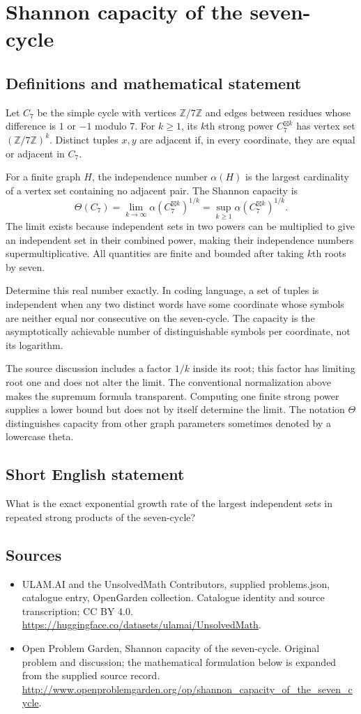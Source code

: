 \documentclass[11pt,a4paper]{article}
\begin{document}
\section*{Shannon capacity of the seven-cycle}\label{statement}

\subsection{Definitions and mathematical statement}
Let $C_7$ be the simple cycle with vertices $\mathbb Z/7\mathbb Z$ and
edges between residues whose difference is $1$ or $-1$ modulo $7$.
For $k\ge1$, its $k$th strong power $C_7^{\boxtimes k}$ has vertex set
$(\mathbb Z/7\mathbb Z)^k$. Distinct tuples $x,y$ are adjacent if,
in every coordinate, they are equal or adjacent in $C_7$.

For a finite graph $H$, the independence number $\alpha(H)$ is the
largest cardinality of a vertex set containing no adjacent pair.
The Shannon capacity is
\[
 \Theta(C_7)=\lim_{k\to\infty}
       \alpha(C_7^{\boxtimes k})^{1/k}
       =\sup_{k\ge1}\alpha(C_7^{\boxtimes k})^{1/k}.
\]
The limit exists because independent sets in two powers can be multiplied
to give an independent set in their combined power, making their
independence numbers supermultiplicative. All quantities are finite and
bounded after taking $k$th roots by seven.

Determine this real number exactly. In coding language, a set of tuples
is independent when any two distinct words have some coordinate whose
symbols are neither equal nor consecutive on the seven-cycle.
The capacity is the asymptotically achievable number of distinguishable
symbols per coordinate, not its logarithm.

The source discussion includes a factor $1/k$ inside its root; this
factor has limiting root one and does not alter the limit. The conventional
normalization above makes the supremum formula transparent. Computing one
finite strong power supplies a lower bound but does not by itself
determine the limit. The notation $\Theta$ distinguishes capacity from
other graph parameters sometimes denoted by a lowercase theta.
\subsection{Short English statement}
What is the exact exponential growth rate of the largest independent sets in repeated strong products of the seven-cycle?
\subsection{Sources}
\begin{itemize}
\item[S1] ULAM.AI and the UnsolvedMath Contributors, supplied problems.json, catalogue entry, OpenGarden collection. Catalogue identity and source transcription; CC BY 4.0.
\url{https://huggingface.co/datasets/ulamai/UnsolvedMath}.
\item[S2] Open Problem Garden, Shannon capacity of the seven-cycle. Original problem and discussion; the mathematical formulation below is expanded from the supplied source record.
\url{http://www.openproblemgarden.org/op/shannon_capacity_of_the_seven_cycle}.
\end{itemize}
\end{document}
